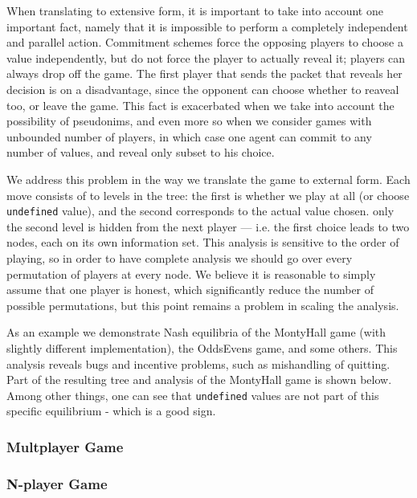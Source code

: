 \documentclass[acmsmall,review,anonymous]{acmart}\settopmatter{printfolios=true,printccs=false,printacmref=false}
\begin{document}
When translating to extensive form, it is important to take into account one important fact, namely that it is impossible to perform a completely independent and parallel action. Commitment schemes force the opposing players to choose a value independently, but do not force the player to actually reveal it; players can always drop off the game. The first player that sends the packet that reveals her decision is on a disadvantage, since the opponent can choose whether to reaveal too, or leave the game. This fact is exacerbated when we take into account the possibility of pseudonims, and even more so when we consider games with unbounded number of players, in which case one agent can commit to any number of values, and reveal only subset to his choice.

We address this problem in the way we translate the game to external form. Each move consists of to levels in the tree: the first is whether we play at all (or choose \texttt{undefined} value), and the second corresponds to the actual value chosen. only the second level is hidden from the next player --- i.e. the first choice leads to two nodes, each on its own information set. This analysis is sensitive to the order of playing, so in order to have complete analysis we should go over every permutation of players at every node. We believe it is reasonable to simply assume that one player is honest, which significantly reduce the number of possible permutations, but this point remains a problem in scaling the analysis.

As an example we demonstrate Nash equilibria of the MontyHall game (with slightly different implementation), the OddsEvens game, and some others. This analysis reveals bugs and incentive problems, such as mishandling of quitting. Part of the resulting tree and analysis of the MontyHall game is shown below. Among other things, one can see that \texttt{undefined} values are not part of this specific equilibrium - which is a good sign.

\subsubsection{Multplayer Game}

\subsubsection{N-player Game}
\end{document}
